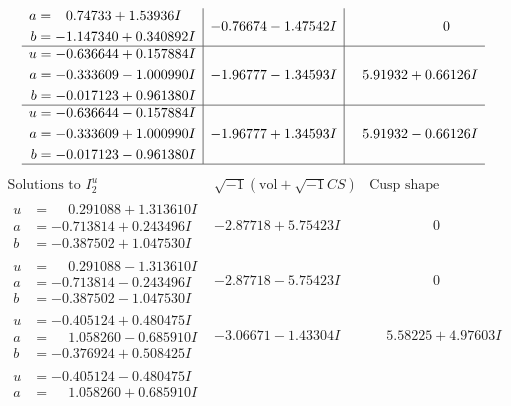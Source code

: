 \documentclass[1p]{elsarticle_modified}
\theoremstyle{definition}
\newcommand{\I}{\sqrt{-1}}
\begin{document}
$$\begin{array}{c|c|c}
\begin{aligned}
a &= \phantom{-}0.74733 + 1.53936 I \\
b &= -1.147340 + 0.340892 I\end{aligned}
 & -0.76674 - 1.47542 I & \phantom{-0.000000 } 0 \\ \hline\begin{aligned}
u &= -0.636644 + 0.157884 I \\
a &= -0.333609 - 1.000990 I \\
b &= -0.017123 + 0.961380 I\end{aligned}
 & -1.96777 - 1.34593 I & \phantom{-}5.91932 + 0.66126 I \\ \hline\begin{aligned}
u &= -0.636644 - 0.157884 I \\
a &= -0.333609 + 1.000990 I \\
b &= -0.017123 - 0.961380 I\end{aligned}
 & -1.96777 + 1.34593 I & \phantom{-}5.91932 - 0.66126 I\\
 \hline 
 \end{array}$$\newpage$$\begin{array}{c|c|c}  
\text{Solutions to }I^u_{2}& \I (\text{vol} + \sqrt{-1}CS) & \text{Cusp shape}\\
 \hline 
\begin{aligned}
u &= \phantom{-}0.291088 + 1.313610 I \\
a &= -0.713814 + 0.243496 I \\
b &= -0.387502 + 1.047530 I\end{aligned}
 & -2.87718 + 5.75423 I & \phantom{-0.000000 } 0 \\ \hline\begin{aligned}
u &= \phantom{-}0.291088 - 1.313610 I \\
a &= -0.713814 - 0.243496 I \\
b &= -0.387502 - 1.047530 I\end{aligned}
 & -2.87718 - 5.75423 I & \phantom{-0.000000 } 0 \\ \hline\begin{aligned}
u &= -0.405124 + 0.480475 I \\
a &= \phantom{-}1.058260 - 0.685910 I \\
b &= -0.376924 + 0.508425 I\end{aligned}
 & -3.06671 - 1.43304 I & \phantom{-}5.58225 + 4.97603 I \\ \hline\begin{aligned}
u &= -0.405124 - 0.480475 I \\
a &= \phantom{-}1.058260 + 0.685910 I \\

\end{aligned}
\end{array}$$
\end{document}
